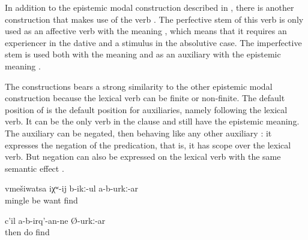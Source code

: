 In addition to the epistemic modal construction described in , there is another construction that makes use of the verb  . The perfective stem of this verb  is only used as an affective verb with the meaning , which means that it requires an experiencer in the dative and a stimulus in the absolutive case. The imperfective stem  is used both with the meaning  and as an auxiliary with the epistemic meaning .

The  constructions bears a strong similarity to the other epistemic modal construction because the lexical verb can be finite or non-finite. The default position of  is the default position for auxiliaries, namely following the lexical verb. It can be the only verb in the clause and still have the epistemic meaning. The auxiliary can be negated, then behaving like any other auxiliary : it expresses the negation of the predication, that is, it has scope over the lexical verb. But negation can also be expressed on the lexical verb with the same semantic effect .
%
\begin{exe}
	\ex	\label{ex:(He) probably does not want to get involved}
	\gll	vmešiwatsa	iχʷ-ij	b-ikː-ul	a-b-urkː-ar\\
		mingle	be	want	find\\
	\glt	{}

	\ex	\label{ex:‎Then he will probably not do (this again)}
	\gll	c'il	a-b-irq'-an-ne	Ø-urkː-ar\\
		then	do	find\\
	\glt	{}
\end{exe}


